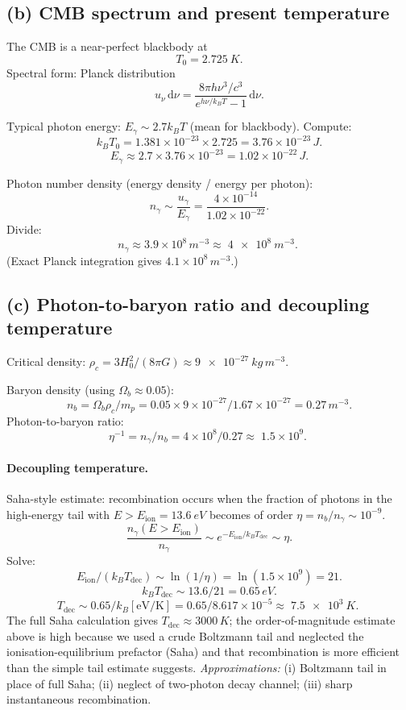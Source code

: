 \documentclass[11pt]{article}
\newcommand{\de}{\mathrm{d}}
\begin{document}
\subsection*{(b) CMB spectrum and present temperature}

The CMB is a near-perfect blackbody at
\[
\boxed{\;T_0 = \SI{2.725}{K}.\;}
\]
Spectral form: Planck distribution
\[
u_\nu\,\de\nu = \frac{8\pi h\nu^3/c^3}{e^{h\nu/k_B T}-1}\,\de\nu.
\]

Typical photon energy: $E_\gamma\sim 2.7 k_B T$ (mean for blackbody). Compute:
\[
k_B T_0 = 1.381\times 10^{-23}\times 2.725 = 3.76\times 10^{-23}\,\si{J}.
\]
\[
E_\gamma \approx 2.7\times 3.76\times 10^{-23} = 1.02\times 10^{-22}\,\si{J}.
\]

Photon number density (energy density / energy per photon):
\[
n_\gamma \sim \frac{u_\gamma}{E_\gamma} = \frac{4\times 10^{-14}}{1.02\times 10^{-22}}.
\]
Divide:
\[
n_\gamma \approx 3.9\times 10^{8}\,\si{m^{-3}} \approx \boxed{\;\SI{4e8}{m^{-3}}.\;}
\]
(Exact Planck integration gives $4.1\times 10^8\,\si{m^{-3}}$.)

\subsection*{(c) Photon-to-baryon ratio and decoupling temperature}

Critical density: $\rho_c = 3 H_0^2/(8\pi G)\approx \SI{9e-27}{kg\,m^{-3}}$.

Baryon density (using $\Omega_b\approx 0.05$):
\[
n_b = \Omega_b\rho_c/m_p = 0.05\times 9\times 10^{-27}/1.67\times 10^{-27} = 0.27\,\si{m^{-3}}.
\]
Photon-to-baryon ratio:
\[
\eta^{-1} = n_\gamma/n_b = 4\times 10^8/0.27 \approx \boxed{\;1.5\times 10^9.\;}
\]

\paragraph{Decoupling temperature.}
Saha-style estimate: recombination occurs when the fraction of photons in the high-energy tail with $E>E_\text{ion} = \SI{13.6}{eV}$ becomes of order $\eta = n_b/n_\gamma\sim 10^{-9}$.
\[
\frac{n_\gamma(E>E_\text{ion})}{n_\gamma}\sim e^{-E_\text{ion}/k_B T_\text{dec}}\sim\eta.
\]
Solve:
\[
E_\text{ion}/(k_B T_\text{dec})\sim \ln(1/\eta) = \ln(1.5\times 10^9) = 21.
\]
\[
k_B T_\text{dec}\sim 13.6/21 = 0.65\,\si{eV}.
\]
\[
T_\text{dec}\sim 0.65/k_B[\text{eV/K}] = 0.65/8.617\times 10^{-5} \approx \boxed{\;\SI{7.5e3}{K}.\;}
\]
The full Saha calculation gives $T_\text{dec}\approx 3000\,\si{K}$; the order-of-magnitude estimate above is high because we used a crude Boltzmann tail and neglected the ionisation-equilibrium prefactor (Saha) and that recombination is more efficient than the simple tail estimate suggests. \emph{Approximations:} (i) Boltzmann tail in place of full Saha; (ii) neglect of two-photon decay channel; (iii) sharp instantaneous recombination.
\end{document}
